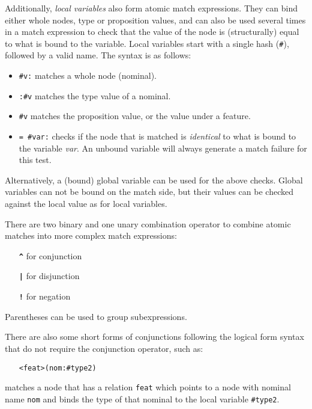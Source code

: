 \documentclass[11pt,a4paper]{article}
\newcommand{\cd}[1]{\texttt{#1}}
\begin{document}
Additionally, \emph{local variables} also form atomic match expressions. They
can bind either whole nodes, type or proposition values, and can also be used
several times in a match expression to check that the value of the node is
(structurally) equal to what is bound to the variable. Local variables start
with a single hash (\cd{\#}), followed by a valid name. The syntax is as
follows:

\begin{itemize}
\item \cd{\#v:} matches a whole node (nominal).
\item \cd{:\#v} matches the type value of a nominal.
\item \cd{\#v} matches the proposition value, or the value under a feature.
\item \cd{= \#var:} checks if the node that is matched is \emph{identical} to
  what is bound to the variable \emph{var}. An unbound variable will always
  generate a match failure for this test.
\end{itemize}

Alternatively, a (bound) global variable can be used for the above checks.
Global variables can not be bound on the match side, but their values can
be checked against the local value as for local variables.

There are two binary and one unary combination operator to combine atomic
matches into more complex match expressions:

\begin{itemize}\addtolength{\itemsep}{-.5\itemsep}
\item[\textbf{\cd{\^}}] for conjunction
\item[\textbf{\cd{|}}] for disjunction
\item[\textbf{\cd{!}}] for negation
\end{itemize}

Parentheses can be used to group subexpressions.

There are also some short forms of conjunctions following the logical form
syntax that do not require the conjunction operator, such as:

\begin{itemize}
\item[] \cd{<feat>(nom:\#type2)}
\end{itemize}
matches a node that has a relation \cd{feat} which points to a node with
nominal name \cd{nom} and binds the type of that nominal to the local variable
\cd{\#type2}.
\end{document}
